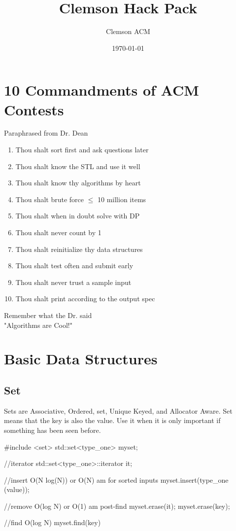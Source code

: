 \documentclass[letterpaper, 10pt]{report}
\title{Clemson Hack Pack}
\author{Clemson ACM}
\date{\today}
\begin{document}
\maketitle

\begingroup
\let\clearpage\relax
\chapter*{10 Commandments of ACM Contests}
\begin{center}Paraphrased from Dr. Dean\end{center}
\begin{multicols}{2}
\begin{enumerate}
    \item Thou shalt sort first and ask questions later
    \item Thou shalt know the STL and use it well
    \item Thou shalt know thy algorithms by heart
    \item Thou shalt brute force $\leq$ 10 million items
    \item Thou shalt when in doubt solve with DP
    \item Thou shalt never count by 1
    \item Thou shalt reinitialize thy data structures
    \item Thou shalt test often and submit early
    \item Thou shalt never trust a sample input
    \item Thou shalt print according to the output spec
\end{enumerate}
\end{multicols}
\begin{center}
Remember what the Dr. said\\
"Algorithms are Cool!"
\end{center}

\endgroup


\tableofcontents

\chapter{Basic Data Structures}
\section{Set}
Sets are Associative, Ordered, set, Unique Keyed, and Allocator Aware\cite{cplusplus}.  Set means that the key is also the value. Use it when it is only important if something has been seen before.
\begin{code}
    #include <set>
    std::set<type_one> myset;

    //iterator
    std::set<type_one>::iterator it;

    //insert O(N log(N)) or O(N) am for sorted inputs
    myset.insert(type_one (value));

    //remove O(log N) or O(1) am post-find
    myset.erase(it);
    myset.erase(key);

    //find O(log N)
    myset.find(key)
\end{code}
\end{document}
